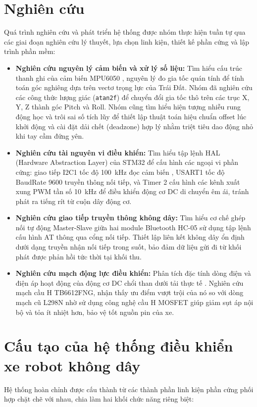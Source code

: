 \section{Nghiên cứu}
Quá trình nghiên cứu và phát triển hệ thống được nhóm thực hiện tuần tự qua các giai đoạn nghiên cứu lý thuyết, lựa chọn linh kiện, thiết kế phần cứng và lập trình phần mềm:
\begin{itemize}
    \item \textbf{Nghiên cứu nguyên lý cảm biến và xử lý số liệu:} Tìm hiểu cấu trúc thanh ghi của cảm biến MPU6050 \cite{mpu6050-register}, nguyên lý đo gia tốc quán tính để tính toán góc nghiêng dựa trên vectơ trọng lực của Trái Đất. Nhóm đã nghiên cứu các công thức lượng giác (\texttt{atan2f}) \cite{serway2018physics} để chuyển đổi gia tốc thô trên các trục X, Y, Z thành góc Pitch và Roll. Nhóm cũng tìm hiểu hiện tượng nhiễu rung động học và trôi sai số tích lũy để thiết lập thuật toán hiệu chuẩn offset lúc khởi động và cài đặt dải chết (deadzone) hợp lý nhằm triệt tiêu dao động nhỏ khi tay cầm đứng yên.
    \item \textbf{Nghiên cứu tài nguyên vi điều khiển:} Tìm hiểu tập lệnh HAL (Hardware Abstraction Layer) của STM32 \cite{stm32-hal} để cấu hình các ngoại vi phần cứng: giao tiếp I2C1 tốc độ \qty{100}{\kilo\hertz} đọc cảm biến \cite{noviello2022mastering}, USART1 tốc độ BaudRate \qty{9600}{\bps} truyền thông nối tiếp, và Timer 2 cấu hình các kênh xuất xung PWM tần số \qty{10}{\kilo\hertz} để điều khiển động cơ DC di chuyển êm ái, tránh phát ra tiếng rít từ cuộn dây động cơ.
    \item \textbf{Nghiên cứu giao tiếp truyền thông không dây:} Tìm hiểu cơ chế ghép nối tự động Master-Slave giữa hai module Bluetooth HC-05 sử dụng tập lệnh cấu hình AT thông qua cổng nối tiếp. Thiết lập liên kết không dây ổn định dưới dạng truyền nhận nối tiếp trong suốt, bảo đảm dữ liệu gửi đi từ khối phát được phản hồi tức thời tại khối thu.
    \item \textbf{Nghiên cứu mạch động lực điều khiển:} Phân tích đặc tính dòng điện và điện áp hoạt động của động cơ DC chổi than dưới tải thực tế \cite{alexander2021fundamentals}. Nghiên cứu mạch cầu H TB6612FNG, nhận thấy ưu điểm vượt trội của nó so với dòng mạch cũ L298N nhờ sử dụng công nghệ cầu H MOSFET giúp giảm sụt áp nội bộ và tỏa ít nhiệt hơn, bảo vệ tốt nguồn pin của xe.
\end{itemize}

\section{Cấu tạo của hệ thống điều khiển xe robot không dây}
Hệ thống hoàn chỉnh được cấu thành từ các thành phần linh kiện phần cứng phối hợp chặt chẽ với nhau, chia làm hai khối chức năng riêng biệt:

